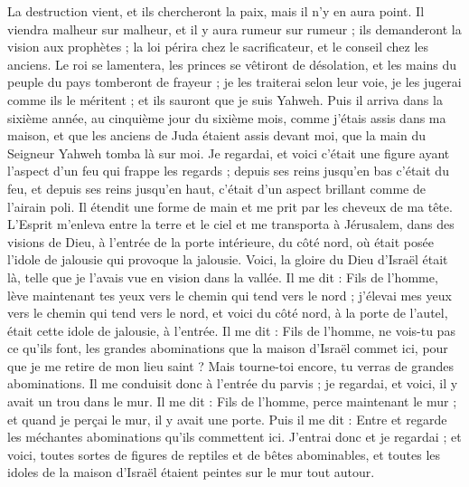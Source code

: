 \begin{multicols}{2}
La destruction vient, et ils chercheront la paix, mais il n'y en aura point.
Il viendra malheur sur malheur, et il y aura rumeur sur rumeur ; ils demanderont la vision aux prophètes ; la loi périra chez le sacrificateur, et le conseil chez les anciens.
Le roi se lamentera, les princes se vêtiront de désolation, et les mains du peuple du pays tomberont de frayeur ; je les traiterai selon leur voie, je les jugerai comme ils le méritent ; et ils sauront que je suis Yahweh.
\VerseOne{}Puis il arriva dans la sixième année, au cinquième jour du sixième mois, comme j'étais assis dans ma maison, et que les anciens de Juda étaient assis devant moi, que la main du Seigneur Yahweh tomba là sur moi.
Je regardai, et voici c’était une figure ayant l’aspect d’un feu qui frappe les regards ; depuis ses reins jusqu'en bas c'était du feu, et depuis ses reins jusqu'en haut, c'était d’un aspect brillant comme de l’airain poli.
Il étendit une forme de main et me prit par les cheveux de ma tête. L'Esprit m'enleva entre la terre et le ciel et me transporta à Jérusalem, dans des visions de Dieu, à l'entrée de la porte intérieure, du côté nord, où était posée l'idole de jalousie  qui provoque la jalousie.
Voici, la gloire du Dieu d'Israël était là, telle que je l’avais vue en vision dans la vallée.
Il me dit : Fils de l’homme, lève maintenant tes yeux vers le chemin qui tend vers le nord ; j'élevai mes yeux vers le chemin qui tend vers le nord, et voici du côté nord, à la porte de l'autel, était cette idole de jalousie, à l'entrée.
Il me dit : Fils de l’homme, ne vois-tu pas ce qu’ils font, les grandes abominations que la maison d'Israël commet ici, pour que je me retire de mon lieu saint ? Mais tourne-toi encore, tu verras de grandes abominations.
Il me conduisit donc à l'entrée du parvis ; je regardai, et voici, il y avait un trou dans le mur.
Il me dit : Fils de l’homme, perce maintenant le mur ; et quand je perçai le mur, il y avait une porte.
Puis il me dit : Entre et regarde les méchantes abominations qu'ils commettent ici.
J'entrai donc et je regardai ; et voici, toutes sortes de figures de reptiles et de bêtes abominables, et toutes les idoles de la maison d'Israël étaient peintes sur le mur tout autour.

\end{multicols}
